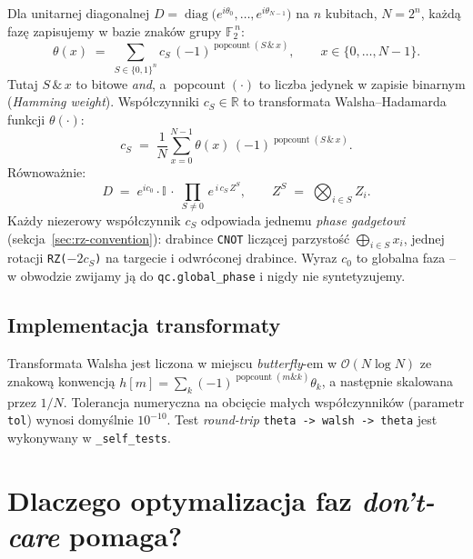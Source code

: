 \documentclass[11pt,a4paper]{article}
\newcommand{\R}{\mathbb{R}}
\newcommand{\F}{\mathbb{F}}
\newcommand{\id}{\mathbb{I}}
\newcommand{\1}{\mathbf{1}}
\newcommand{\bigO}{\mathcal{O}}
\newcommand{\diag}{\operatorname{diag}}
\newcommand{\popcount}{\operatorname{popcount}}
\newcommand{\code}[1]{\texttt{#1}}
\begin{document}
Dla unitarnej diagonalnej $D=\diag\bigl(e^{i\theta_{0}},\dots,
e^{i\theta_{N-1}}\bigr)$ na $n$ kubitach, $N=2^{n}$, każdą fazę
zapisujemy w bazie znaków grupy $\F_{2}^{\,n}$:
\begin{equation}
\label{eq:walsh-expansion}
\theta(x) \;=\; \sum_{S\in\{0,1\}^{n}} c_{S}\,(-1)^{\popcount(S \,\&\, x)},
\qquad x\in\{0,\dots,N-1\}.
\end{equation}
Tutaj $S\,\&\, x$ to bitowe \emph{and}, a $\popcount(\cdot)$ to liczba
jedynek w zapisie binarnym (\emph{Hamming weight}). Współczynniki
$c_{S}\in\R$ to transformata Walsha--Hadamarda funkcji $\theta(\cdot)$:
\begin{equation}
\label{eq:walsh-coeff}
c_{S} \;=\; \frac{1}{N}\sum_{x=0}^{N-1}\theta(x)\,(-1)^{\popcount(S\,\&\, x)}.
\end{equation}
Równoważnie:
\begin{equation}
\label{eq:walsh-D}
D \;=\; e^{i c_{0}}\cdot\id\,\cdot\;\prod_{S\neq 0}\,e^{\,i\,c_{S}\,Z^{S}},
\qquad
Z^{S}\;=\;\bigotimes_{i\in S} Z_{i}.
\end{equation}
Każdy niezerowy współczynnik $c_{S}$ odpowiada jednemu \emph{phase
gadgetowi} (sekcja~\ref{sec:rz-convention}): drabince \code{CNOT}
liczącej parzystość $\bigoplus_{i\in S} x_{i}$, jednej rotacji
\code{RZ($-2 c_{S}$)} na targecie i odwróconej drabince. Wyraz $c_{0}$
to globalna faza -- w obwodzie zwijamy ją do \code{qc.global\_phase}
i nigdy nie syntetyzujemy.

\subsection{Implementacja transformaty}

Transformata Walsha jest liczona w miejscu \emph{butterfly}-em w
$\bigO(N\log N)$ ze znakową konwencją
$h[m]=\sum_{k}(-1)^{\popcount(m\&k)}\theta_{k}$, a następnie skalowana
przez $1/N$. Tolerancja numeryczna na obcięcie małych współczynników
(parametr \code{tol}) wynosi domyślnie $10^{-10}$. Test \emph{round-trip}
\code{theta -> walsh -> theta} jest wykonywany w
\code{\_self\_tests}.

\section{Dlaczego optymalizacja faz \emph{don't-care} pomaga?}
\label{sec:why-helps}
\end{document}
